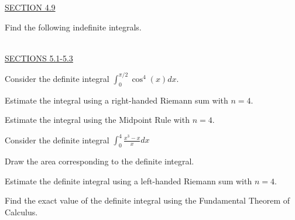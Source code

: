 \documentclass{exam}
\begin{document}
\underline{SECTION 4.9}

\begin{questions}

\question Find the following indefinite integrals.
\begin{parts}
\part $\displaystyle\int \frac{1}{1+9x^2} dx $ 
\part $\displaystyle\int \frac{1}{\sqrt{1-9x^2}} dx$
\part $\displaystyle\int \csc(9x)\left(\cot(9x)-\csc(9x)\right)dx$
\end{parts}

\ \\
\underline{SECTIONS 5.1-5.3}

\question Consider the definite integral $\displaystyle\int_0^{\pi/2}\cos^4(x)dx$.
  \begin{parts}
  \item Estimate the integral using a right-handed Riemann sum with $n=4$. %
  \item Estimate the integral using the Midpoint Rule with $n=4$. %
  \end{parts}
\question Consider the definite integral $\displaystyle\int_0^4 \frac{x^3-x}{x}dx$
  \begin{parts}
  \item Draw the area corresponding to the definite integral. %
  \item Estimate the definite integral using a left-handed Riemann sum with $n=4$. %
  \item Find the exact value of the definite integral using the Fundamental Theorem of Calculus. %
  \end{parts}
  

\end{questions}
\end{document}
